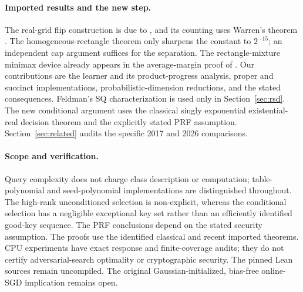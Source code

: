 \paragraph{Imported results and the new step.}
The real-grid flip construction is due to \citet{HHPTZ22}, and its counting uses Warren's theorem \citep{Warren68,AMY16}. The homogeneous-rectangle theorem \citep{APP05} only sharpens the constant to $2^{-15}$; an independent cap argument suffices for the separation. The rectangle-mixture minimax device already appears in the average-margin proof of \citet[Theorem~3.1]{HHPTZ22}. Our contributions are the learner and its product-progress analysis, proper and succinct implementations, probabilistic-dimension reductions, and the stated consequences. Feldman's SQ characterization is used only in Section~\ref{sec:rsd}. The new conditional argument uses the classical singly exponential existential-real decision theorem and the explicitly stated PRF assumption. Section~\ref{sec:related} audits the specific 2017 and 2026 comparisons.

\paragraph{Scope and verification.}
Query complexity does not charge class description or computation; table-polynomial and seed-polynomial implementations are distinguished throughout. The high-rank unconditioned selection is non-explicit, whereas the conditional selection has a negligible exceptional key set rather than an efficiently identified good-key sequence. The PRF conclusions depend on the stated security assumption. The proofs use the identified classical and recent imported theorems. CPU experiments have exact response and finite-coverage audits; they do not certify adversarial-search optimality or cryptographic security. The pinned Lean sources remain uncompiled. The original Gaussian-initialized, bias-free online-SGD implication remains open.

